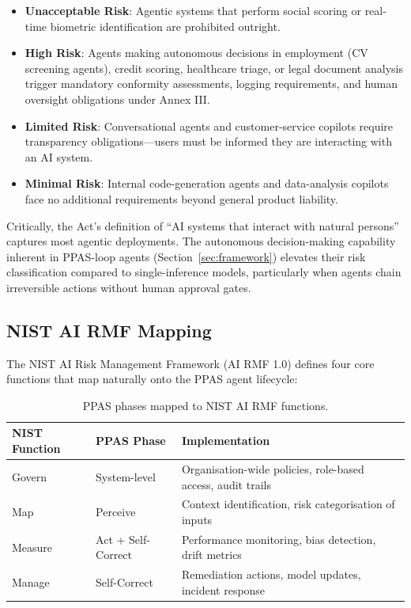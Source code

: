 \documentclass[12pt, a4paper]{article}
\begin{document}
\begin{itemize}
    \item \textbf{Unacceptable Risk}: Agentic systems that perform social scoring or real-time biometric identification are prohibited outright.
    \item \textbf{High Risk}: Agents making autonomous decisions in employment (CV screening agents), credit scoring, healthcare triage, or legal document analysis trigger mandatory conformity assessments, logging requirements, and human oversight obligations under Annex III.
    \item \textbf{Limited Risk}: Conversational agents and customer-service copilots require transparency obligations---users must be informed they are interacting with an AI system.
    \item \textbf{Minimal Risk}: Internal code-generation agents and data-analysis copilots face no additional requirements beyond general product liability.
\end{itemize}

Critically, the Act's definition of ``AI systems that interact with natural persons'' captures most agentic deployments. The autonomous decision-making capability inherent in PPAS-loop agents (Section~\ref{sec:framework}) elevates their risk classification compared to single-inference models, particularly when agents chain irreversible actions without human approval gates.

\subsection{NIST AI RMF Mapping}
The NIST AI Risk Management Framework (AI RMF 1.0) defines four core functions that map naturally onto the PPAS agent lifecycle:

\begin{table}[h]
\caption{PPAS phases mapped to NIST AI RMF functions.}
\label{tab:nist-mapping}
\begin{tabular}{lll}
\toprule
\textbf{NIST Function} & \textbf{PPAS Phase} & \textbf{Implementation} \\
\midrule
Govern & System-level & Organisation-wide policies, role-based access, audit trails \\
Map & Perceive & Context identification, risk categorisation of inputs \\
Measure & Act + Self-Correct & Performance monitoring, bias detection, drift metrics \\
Manage & Self-Correct & Remediation actions, model updates, incident response \\
\bottomrule
\end{tabular}
\end{table}
\end{document}

